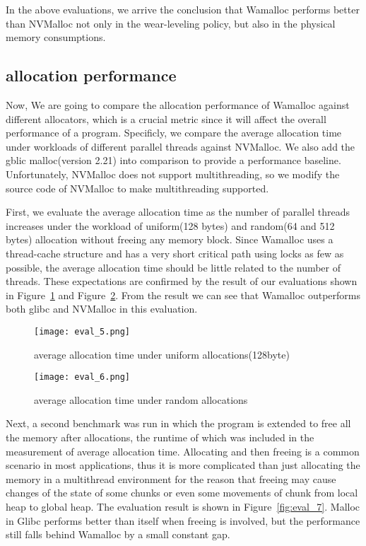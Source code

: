 \documentclass[10pt, conference, compsocconf]{IEEEtran}
\begin{document}
In the above evaluations, we arrive the conclusion that
Wamalloc performs better than NVMalloc not only in the wear-leveling policy,
but also in the physical memory consumptions.

\subsection{allocation performance}

Now, We are going to compare the allocation performance of Wamalloc against different allocators,
which is a crucial metric since it will affect the overall performance of a program.
Specificly, we compare the average allocation time under workloads of different parallel threads against NVMalloc.
We also add the gblic malloc(version 2.21) into comparison to provide a performance baseline.
Unfortunately, NVMalloc does not support multithreading,
so we modify the source code of NVMalloc to make multithreading supported.

First, we evaluate the average allocation time as the number of parallel threads increases
under the workload of uniform(128 bytes) and random(64 and 512 bytes) allocation without freeing any memory block.
Since Wamalloc uses a thread-cache structure and has a very short critical path using locks as few as possible,
the average allocation time should be little related to the number of threads.
These expectations are confirmed by the result of our evaluations shown in Figure~\ref{fig:eval_5} and Figure~\ref{fig:eval_6}.
From the result we can see that Wamalloc outperforms both glibc and NVMalloc in this evaluation.


\begin{figure}[t]
\centering
\texttt{[image: eval\_5.png]}
\caption{average allocation time under uniform allocations(128byte)}
\label{fig:eval_5}
\end{figure}

\begin{figure}[t]
\centering
\texttt{[image: eval\_6.png]}
\caption{average allocation time under random allocations}
\label{fig:eval_6}
\end{figure}

Next, a second benchmark was run in which the program is extended to free all the memory after allocations, 
the runtime of which was included in the measurement of average allocation time.
Allocating and then freeing is a common scenario in most applications, thus it is more complicated than just allocating the memory in a multithread environment 
for the reason that freeing may cause changes of the state of some chunks or even some movements of chunk from local heap to global heap.
The evaluation result is shown in Figure~\ref{fig:eval_7}.
Malloc in Glibc performs better than itself when freeing is involved, but the performance still falls behind Wamalloc by a small constant gap.
\end{document}
